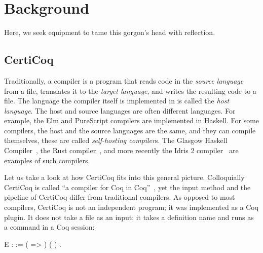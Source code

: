 
\chapter{Background}
\label{background}

\epigraph{Here, we seek equipment to tame this gorgon’s head with \gls{reflection}.}{\citet{chapman2010gentle}}

\section{CertiCoq}

Traditionally, a compiler is a program that reads code in the \emph{\gls{source language}} from a file, translates it to the \emph{\gls{target language}}, and writes the resulting code to a file. The language the compiler itself is implemented in is called the \emph{\gls{host language}}.
The host and source languages are often different languages. For example, the Elm and PureScript compilers are implemented in Haskell. For some compilers, the host and the source languages are the same, and they can compile themselves, these are called \emph{self-hosting compiler}s. The Glasgow Haskell Compiler~\cite{jones1993glasgow,marlow2004glasgow}, the Rust compiler~\cite{matsakis2014rust}, and more recently the Idris 2 compiler~\cite{brady2021idris} are examples of such compilers.

Let us take a look at how CertiCoq fits into this general picture. Colloquially CertiCoq is called ``a compiler for Coq in Coq''~\cite{certicoq}, yet the input method and the pipeline of CertiCoq differ from traditional compilers. As opposed to most compilers, CertiCoq is not an independent program; it was implemented as a Coq plugin. It does not take a file as an input; it takes a definition name and runs as a command in a Coq session:

\newcommand{\listsum}{\hyperref[code:listsum]{}}
\vspace{.1in}
\begin{SaveVerbatim}{E}
 \listsum{}\label{code:listsum} :  :=
   (   =>  \fn{+} ) (  ) .
\end{SaveVerbatim}


